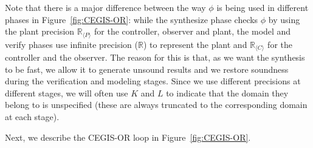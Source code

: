 \documentclass[sigconf]{llncs}
\newcommand{\mat}[1]{{#1}}
\begin{document}

Note that there is a major difference between the way $\phi$ is being used
in different phases in Figure~\ref{fig:CEGIS-OR}: while the {\sc synthesize}
phase checks $\phi$ by using the plant precision $\mathbb{R}_{\langle P
\rangle}$ for the controller, observer and plant, the {\sc model} and {\sc
verify} phases use infinite precision ($\mathbb{R}$) to represent the plant
and $\mathbb{R}_{\langle C \rangle}$ for the controller and the observer. 
The reason for this is that, as we want the synthesis to be fast, we allow
it to generate unsound results and we restore soundness during the
verification and modeling stages.  Since we use different precisions at
different stages, we will often use $\mat{K}$ and $\mat{L}$ to indicate that
the domain they belong to is unspecified (these are always truncated to the
corresponding domain at each stage).
%

\medskip

Next, we describe the CEGIS-OR loop in Figure~\ref{fig:CEGIS-OR}.
\end{document}
